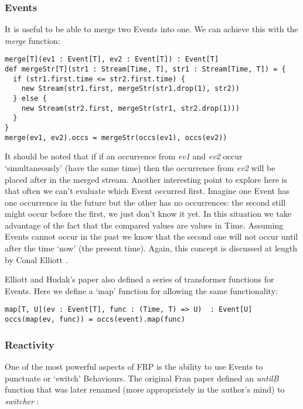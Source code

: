       \subsubsection{Events}
        It is useful to be able to merge two Events into one. We can achieve this with the \emph{merge} function:

\begin{verbatim}
merge[T](ev1 : Event[T], ev2 : Event[T]) : Event[T]
def mergeStr[T](str1 : Stream[Time, T], str1 : Stream[Time, T]) = {
  if (str1.first.time <= str2.first.time) {
    new Stream(str1.first, mergeStr(str1.drop(1), str2))
  } else {
    new Stream(str2.first, mergeStr(str1, str2.drop(1)))
  }
}
merge(ev1, ev2).occs = mergeStr(occs(ev1), occs(ev2))
\end{verbatim}            

      It should be noted that if if an occurrence from \emph{ev1} and \emph{ev2} occur `simultaneously' (have the same time) then
      the occurrence from \emph{ev2} will be placed after in the merged stream. Another interesting point to explore
      here is that often we can't evaluate which Event occurred first. Imagine one Event has one occurrence in
      the future but the other has no occurrences: the second still might occur before the first, we just don't know it
      yet. In this situation we take advantage of the fact that the compared values are values in Time. Assuming
      Events cannot occur in the past we know that the second one will not occur until after the time `now' (the
      present time). Again, this concept is discussed at length by Conal Elliott \cite{Elliott2009}.
       
       Elliott and Hudak's paper also defined a series of transformer functions for Events. Here we define a
       `map' function for allowing the same functionality:

\begin{verbatim}
map[T, U](ev : Event[T], func : (Time, T) => U)  : Event[U]
occs(map(ev, func)) = occs(event).map(func)
\end{verbatim}         
        
      \subsubsection{Reactivity}
        One of the most powerful aspects of FRP is the ability to use Events to punctuate or `switch' Behaviours.
        The original Fran paper defined an \emph{untilB} function that was later renamed (more appropriately in the
        author's mind) to \emph{switcher} \cite{Elliott2009}:

